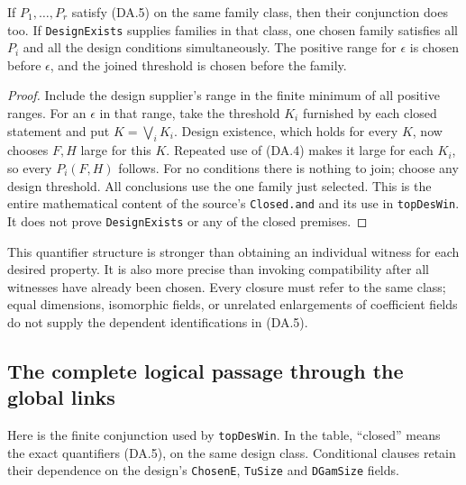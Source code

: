 \begin{proposition}
\label{prop:da-closed-join}
If $P_1,\ldots,P_r$ satisfy (DA.5) on the same family class, then
their conjunction does too.  If \texttt{DesignExists} supplies families
in that class, one chosen family satisfies all $P_i$ and all the design
conditions simultaneously.  The positive range for $\epsilon$ is chosen
before $\epsilon$, and the joined threshold is chosen before the family.
\end{proposition}

\begin{proof}
Include the design supplier's range in the finite minimum of all
positive ranges.  For an $\epsilon$ in that range, take
the threshold $K_i$ furnished by each closed statement and put
$K=\bigvee_iK_i$.  Design existence, which holds for every $K$, now
chooses $F,H$ large for this $K$.  Repeated use of (DA.4) makes it large
for each $K_i$, so every $P_i(F,H)$ follows.  For no conditions there is
nothing to join; choose any design threshold.  All conclusions use the
one family just selected.  This is the entire mathematical content of
the source's \texttt{Closed.and} and its use in \texttt{topDesWin}.
It does not prove \texttt{DesignExists} or any of the closed premises.
\end{proof}

This quantifier structure is stronger than obtaining an individual
witness for each desired property.  It is also more precise than
invoking compatibility after all witnesses have already been chosen.
Every closure must refer to the same class; equal dimensions, isomorphic
fields, or unrelated enlargements of coefficient fields do not supply
the dependent identifications in (DA.5).

\subsection{The complete logical passage through the global links}

Here is the finite conjunction used by \texttt{topDesWin}.  In the table,
``closed'' means the exact quantifiers (DA.5), on the same design class.
Conditional clauses retain their dependence on the design's
\texttt{ChosenE}, \texttt{TuSize} and \texttt{DGamSize} fields.

